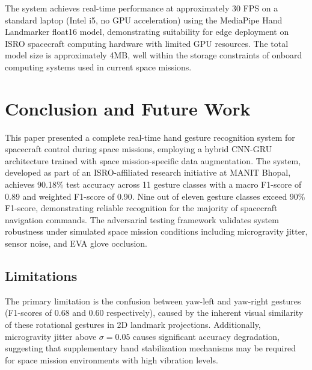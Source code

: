 \documentclass[conference]{IEEEtran}
\begin{document}
The system achieves real-time performance at approximately 30 FPS on a standard laptop (Intel i5, no GPU acceleration) using the MediaPipe Hand Landmarker float16 model, demonstrating suitability for edge deployment on ISRO spacecraft computing hardware with limited GPU resources. The total model size is approximately 4MB, well within the storage constraints of onboard computing systems used in current space missions.

\section{Conclusion and Future Work}

This paper presented a complete real-time hand gesture recognition system for spacecraft control during space missions, employing a hybrid CNN-GRU architecture trained with space mission-specific data augmentation. The system, developed as part of an ISRO-affiliated research initiative at MANIT Bhopal, achieves 90.18\% test accuracy across 11 gesture classes with a macro F1-score of 0.89 and weighted F1-score of 0.90. Nine out of eleven gesture classes exceed 90\% F1-score, demonstrating reliable recognition for the majority of spacecraft navigation commands. The adversarial testing framework validates system robustness under simulated space mission conditions including microgravity jitter, sensor noise, and EVA glove occlusion.

\subsection{Limitations}
The primary limitation is the confusion between yaw-left and yaw-right gestures (F1-scores of 0.68 and 0.60 respectively), caused by the inherent visual similarity of these rotational gestures in 2D landmark projections. Additionally, microgravity jitter above $\sigma=0.05$ causes significant accuracy degradation, suggesting that supplementary hand stabilization mechanisms may be required for space mission environments with high vibration levels.
\end{document}
